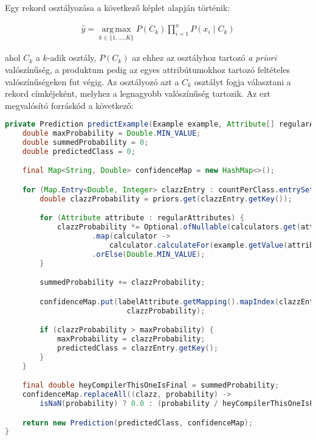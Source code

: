 \documentclass[a4paper]{article}
\DeclareMathOperator*{\argmax}{arg\,max}
\begin{document}
Egy rekord osztályozása a következő képlet alapján történik:

\begin{align*}
    \hat{y} = \argmax\limits_{k \in \{1, \ldots, K\}} P(C_k) \prod\limits_{i = 1}^{n}P(x_i \; | \; C_k)
\end{align*}

ahol $C_k$ a $k$-adik osztály, $P(C_k)$ az ehhez az osztályhoz tartozó \textit{a priori} valószínűség, a produktum pedig az egyes attribútumokhoz tartozó feltételes valószínűségeken fut végig. Az osztályozó azt a $C_k$ osztályt fogja választani a rekord címkéjeként, melyhez a legnagyobb valószínűség tartozik. Az ezt megvalósító forráskód a következő:

\begin{lstlisting}[language=Java, caption={Rekord osztályozása.}, captionpos=b, escapechar=$]
private Prediction predictExample(Example example, Attribute[] regularAttributes) {
    double maxProbability = Double.MIN_VALUE;
    double summedProbability = 0;
    double predictedClass = 0;

    final Map<String, Double> confidenceMap = new HashMap<>();

    for (Map.Entry<Double, Integer> clazzEntry : countPerClass.entrySet()) {
        double clazzProbability = priors.get(clazzEntry.getKey());

        for (Attribute attribute : regularAttributes) {
            clazzProbability *= Optional.ofNullable(calculators.get(attribute.getName()))
                    .map(calculator ->
                        calculator.calculateFor(example.getValue(attribute), clazzEntry.getKey()))
                    .orElse(Double.MIN_VALUE);
        }

        summedProbability += clazzProbability;

        confidenceMap.put(labelAttribute.getMapping().mapIndex(clazzEntry.getKey().intValue()), 
                            clazzProbability);

        if (clazzProbability > maxProbability) {
            maxProbability = clazzProbability;
            predictedClass = clazzEntry.getKey();
        }
    }

    final double heyCompilerThisOneIsFinal = summedProbability;
    confidenceMap.replaceAll((clazz, probability) ->
        isNaN(probability) ? 0.0 : (probability / heyCompilerThisOneIsFinal));

    return new Prediction(predictedClass, confidenceMap);
}
\end{lstlisting}
\end{document}
